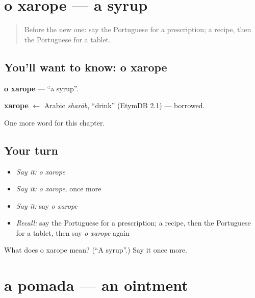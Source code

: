 \section[o xarope]{o xarope — a syrup}

\label{lesson:PT-C210-xarope}



\begin{quote}
Before the new one: say the Portuguese for a prescription; a recipe, then the Portuguese for a tablet.
\end{quote}

\subsection*{You'll want to know: o xarope}
\textbf{o xarope} — \textquotedblleft{}a syrup\textquotedblright{}.

\begin{cousinweb}
\textbf{xarope} $\leftarrow$ Arabic \emph{sharāb}, \textquotedblleft{}drink\textquotedblright{} (EtymDB 2.1) — borrowed.
\end{cousinweb}

\begin{grammarlens}[title={What you've built}]
One more word for this chapter.
\end{grammarlens}

\subsection*{Your turn}
\begin{itemize}
\raggedright
  \item \emph{Say it:} \emph{o xarope}
  \item \emph{Say it:} \emph{o xarope}, once more
  \item \emph{Say it:} say \emph{o xarope}
  \item \emph{Recall:} say the Portuguese for a prescription; a recipe, then the Portuguese for a tablet, then say \emph{o xarope} again
\end{itemize}

\begin{tcolorbox}[breakable,colback=teal!4,colframe=teal!35!black,title={Before you move on}]
What does o xarope mean? (\textquotedblleft{}A syrup\textquotedblright{}.) Say it once more.
\end{tcolorbox}
\section[a pomada]{a pomada — an ointment}

